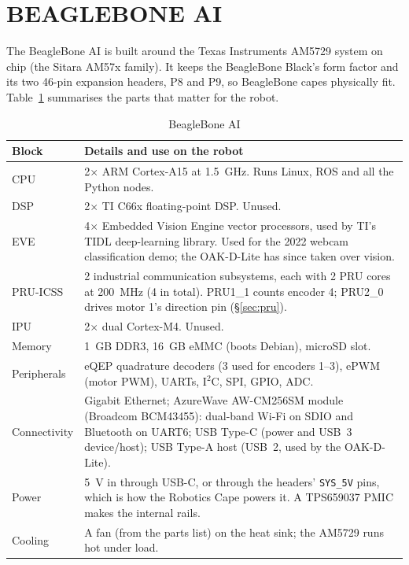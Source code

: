 \section{BEAGLEBONE AI}
\label{sec:bbai}

The BeagleBone AI is built around the Texas Instruments AM5729 system on chip
(the Sitara AM57x family). It keeps the BeagleBone Black's form factor and its
two 46-pin expansion headers, P8 and P9, so BeagleBone capes physically fit.
Table~\ref{tab:bbai} summarises the parts that matter for the robot.

\begin{table}[htbp]
\centering
\caption{BeagleBone AI}
\label{tab:bbai}
\small
\begin{tabularx}{\linewidth}{>{\raggedright\arraybackslash}p{1.45in}X}
\toprule
Block & Details and use on the robot \\
\midrule
CPU & 2$\times$ ARM Cortex-A15 at \SI{1.5}{GHz}. Runs Linux, ROS and all the
  Python nodes. \\
DSP & 2$\times$ TI C66x floating-point DSP. Unused. \\
EVE & 4$\times$ Embedded Vision Engine vector processors, used by TI's TIDL
  deep-learning library. Used for the 2022 webcam classification demo; the
  OAK-D-Lite has since taken over vision. \\
PRU-ICSS & 2 industrial communication subsystems, each with 2 PRU cores at
  \SI{200}{MHz} (4 in total). PRU1\_1 counts encoder 4; PRU2\_0 drives motor 1's
  direction pin (\S\ref{sec:pru}). \\
IPU & 2$\times$ dual Cortex-M4. Unused. \\
Memory & \SI{1}{GB} DDR3, \SI{16}{GB} eMMC (boots Debian), microSD slot. \\
Peripherals & eQEP quadrature decoders (3 used for encoders 1--3), ePWM
  (motor PWM), UARTs, I$^2$C, SPI, GPIO, ADC. \\
Connectivity & Gigabit Ethernet; AzureWave AW-CM256SM module (Broadcom BCM43455):
  dual-band Wi-Fi on SDIO and Bluetooth on UART6; USB Type-C (power and USB~3
  device/host); USB Type-A host (USB~2, used by the OAK-D-Lite). \\
Power & \SI{5}{V} in through USB-C, or through the headers' \texttt{SYS\_5V}
  pins, which is how the Robotics Cape powers it. A TPS659037 PMIC makes the
  internal rails. \\
Cooling & A fan (from the parts list) on the heat sink; the AM5729 runs hot
  under load. \\
\bottomrule
\end{tabularx}
\end{table}

